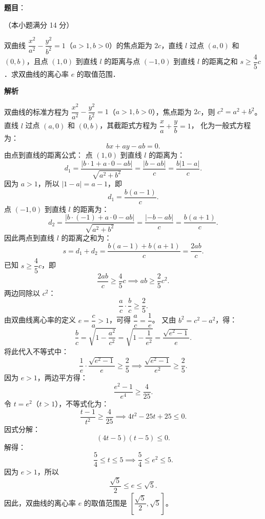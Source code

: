 \begin{answer}

\textbf{题目}：

（本小题满分 14 分）

双曲线 $\dfrac{x^2}{a^2}-\dfrac{y^2}{b^2}=1$（$a>1,b>0$）的焦点距为 $2c$，直线 $l$ 过点 $(a,0)$ 和 $(0,b)$，且点 $(1,0)$ 到直线 $l$ 的距离与点 $(-1,0)$ 到直线 $l$ 的距离之和 $s\geqslant\dfrac{4}{5}c$．求双曲线的离心率 $e$ 的取值范围．

\textbf{解析}

双曲线的标准方程为 $\dfrac{x^2}{a^2}-\dfrac{y^2}{b^2}=1$（$a>1,b>0$），焦点距为 $2c$，则 $c^2=a^2+b^2$。
直线 $l$ 过点 $(a,0)$ 和 $(0,b)$，其截距式方程为 $\dfrac{x}{a}+\dfrac{y}{b}=1$，
化为一般式方程为：
\nopagebreak[4]
\[
bx+ay-ab=0.
\]
由点到直线的距离公式：
点 $(1,0)$ 到直线 $l$ 的距离为：
\nopagebreak[4]
\[
d_1=\frac{|b\cdot 1+a\cdot 0-ab|}{\sqrt{a^2+b^2}}=\frac{|b-ab|}{c}=\frac{b|1-a|}{c}.
\]
因为 $a>1$，所以 $|1-a|=a-1$，即
\nopagebreak[4]
\[
d_1=\frac{b(a-1)}{c}.
\]
点 $(-1,0)$ 到直线 $l$ 的距离为：
\nopagebreak[4]
\[
d_2=\frac{|b\cdot(-1)+a\cdot 0-ab|}{\sqrt{a^2+b^2}}=\frac{|-b-ab|}{c}=\frac{b(a+1)}{c}.
\]
因此两点到直线 $l$ 的距离之和为：
\nopagebreak[4]
\[
s=d_1+d_2=\frac{b(a-1)+b(a+1)}{c}=\frac{2ab}{c}.
\]
已知 $s\geqslant\dfrac{4}{5}c$，即
\nopagebreak[4]
\[
\frac{2ab}{c}\geqslant\frac{4}{5}c\implies ab\geqslant\frac{2}{5}c^2.
\]
两边同除以 $c^2$：
\nopagebreak[4]
\[
\frac{a}{c}\cdot\frac{b}{c}\geqslant\frac{2}{5}.
\]
由双曲线离心率的定义 $e=\dfrac{c}{a}>1$，可得 $\dfrac{a}{c}=\dfrac{1}{e}$。
又由 $b^2=c^2-a^2$，得：
\nopagebreak[4]
\[
\frac{b}{c}=\sqrt{1-\frac{a^2}{c^2}}=\sqrt{1-\frac{1}{e^2}}=\frac{\sqrt{e^2-1}}{e}.
\]
将此代入不等式中：
\nopagebreak[4]
\[
\frac{1}{e}\cdot\frac{\sqrt{e^2-1}}{e}\geqslant\frac{2}{5}\implies\frac{\sqrt{e^2-1}}{e^2}\geqslant\frac{2}{5}.
\]
因为 $e>1$，两边平方得：
\nopagebreak[4]
\[
\frac{e^2-1}{e^4}\geqslant\frac{4}{25}.
\]
令 $t=e^2$（$t>1$），不等式化为：
\nopagebreak[4]
\[
\frac{t-1}{t^2}\geqslant\frac{4}{25}\implies 4t^2-25t+25\leqslant 0.
\]
因式分解：
\nopagebreak[4]
\[
(4t-5)(t-5)\leqslant 0.
\]
解得：
\nopagebreak[4]
\[
\frac{5}{4}\leqslant t\leqslant 5\implies\frac{5}{4}\leqslant e^2\leqslant 5.
\]
因为 $e>1$，所以
\nopagebreak[4]
\[
\frac{\sqrt{5}}{2}\leqslant e\leqslant\sqrt{5}.
\]
因此，双曲线的离心率 $e$ 的取值范围是 $\left[\dfrac{\sqrt{5}}{2},\sqrt{5}\right]$。


\end{answer}